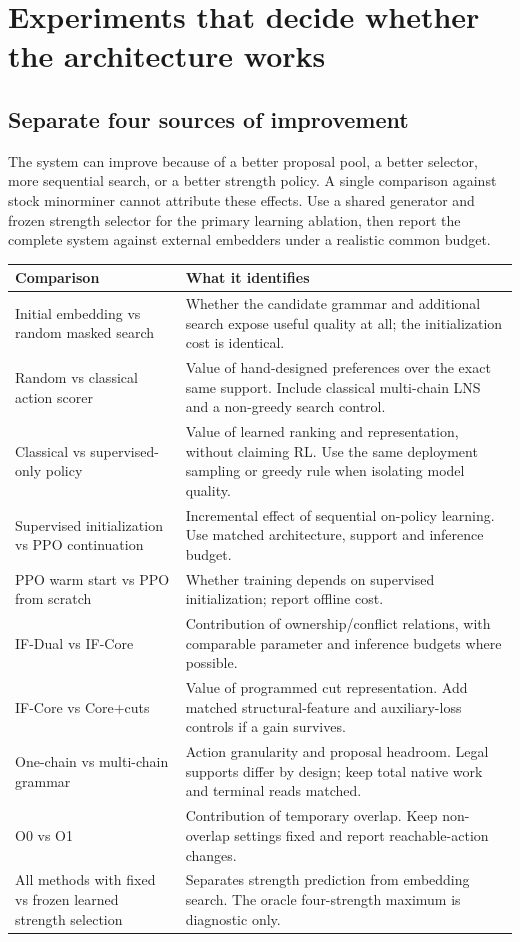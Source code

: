\section{Experiments that decide whether the architecture works}\label{sec:evaluation}
\subsection{Separate four sources of improvement}
The system can improve because of a better proposal pool, a better selector, more sequential search, or a better strength policy. A single comparison against stock minorminer cannot attribute these effects. Use a shared generator and frozen strength selector for the primary learning ablation, then report the complete system against external embedders under a realistic common budget.

{\small\begin{longtable}{@{}P{.24\textwidth}P{.69\textwidth}@{}}
\toprule
Comparison & What it identifies\\\midrule\endhead
Initial embedding vs random masked search & Whether the candidate grammar and additional search expose useful quality at all; the initialization cost is identical.\\
Random vs classical action scorer & Value of hand-designed preferences over the exact same support. Include classical multi-chain LNS and a non-greedy search control.\\
Classical vs supervised-only policy & Value of learned ranking and representation, without claiming RL. Use the same deployment sampling or greedy rule when isolating model quality.\\
Supervised initialization vs PPO continuation & Incremental effect of sequential on-policy learning. Use matched architecture, support and inference budget.\\
PPO warm start vs PPO from scratch & Whether training depends on supervised initialization; report offline cost.\\
IF-Dual vs IF-Core & Contribution of ownership/conflict relations, with comparable parameter and inference budgets where possible.\\
IF-Core vs Core+cuts & Value of programmed cut representation. Add matched structural-feature and auxiliary-loss controls if a gain survives.\\
One-chain vs multi-chain grammar & Action granularity and proposal headroom. Legal supports differ by design; keep total native work and terminal reads matched.\\
O0 vs O1 & Contribution of temporary overlap. Keep non-overlap settings fixed and report reachable-action changes.\\
All methods with fixed vs frozen learned strength selection & Separates strength prediction from embedding search. The oracle four-strength maximum is diagnostic only.\\
\bottomrule\end{longtable}}

